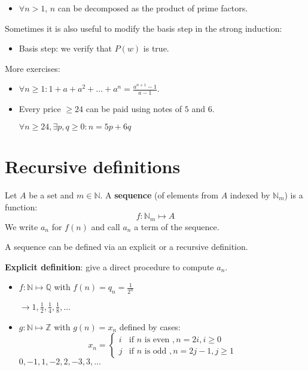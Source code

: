 \documentclass[12pt, a4paper]{book}
\begin{document}
\begin{itemize}
    \item $\forall n>1$, $n$ can be decomposed as the product of prime factors.
\end{itemize}

Sometimes it is also useful to modify the basis step in the strong induction:
\begin{itemize}
    \item Basis step: we verify that $P(w)$ is true.
\end{itemize}

More exercises:
\begin{itemize}
    \item $\displaystyle \forall n \geq 1: 1+a+a^2+\ldots + a^n = \frac{a^{n+1}-1}{a-1}$.
    \item Every price $\geq 24$ can be paid using notes of $5$ and $6$.

    $\forall n \geq 24, \exists p,q\geq 0: n = 5p + 6q$
\end{itemize}


\section{Recursive definitions}

\begin{defn}
    Let $A$ be a set and $m\in\mathbb{N}$. A \textbf{sequence} (of elements from $A$ indexed by $\mathbb{N}_m$) is a function:
    \[
        f:\mathbb{N}_m \mapsto A
    \]
    We write $a_n$ for $f(n)$ and call $a_n$ a term of the sequence.
\end{defn}

A sequence can be defined via an explicit or a recursive definition.

\begin{defn}
    \textbf{Explicit definition}: give a direct procedure to compute $a_n$.
    \begin{itemize}
        \item $f:\mathbb{N} \mapsto \mathbb{Q}$ with $\displaystyle f(n) = q_n = \frac{1}{2^n}$

        $\longrightarrow \displaystyle 1, \frac{1}{2}, \frac{1}{4}, \frac{1}{8}, \ldots$
        \item $g:\mathbb{N} \mapsto \mathbb{Z}$ with $g(n) = x_n$ defined by cases:
        \[
            x_n = 
            \begin{cases}
                i & \text{if } n \text{ is even }, n=2i, i \geq 0 \\
                j & \text{if } n \text{ is odd }, n=2j-1, j \geq 1
            \end{cases}
        \]
        $0,-1,1,-2,2,-3,3,\ldots$
    \end{itemize}
\end{defn}
\end{document}
